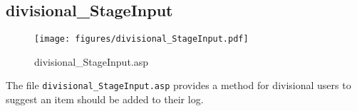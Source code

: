 \subsection{divisional\_StageInput}
\begin{figure}[htb]
    \begin{center}
        \texttt{[image: figures/divisional\_StageInput.pdf]}
    \end{center}
    \caption{divisional\_StageInput.asp}
    \label{fig:divisional_StageInput}
\end{figure}

The file \verb|divisional_StageInput.asp| provides a method for divisional users
to suggest an item should be added to their log.
